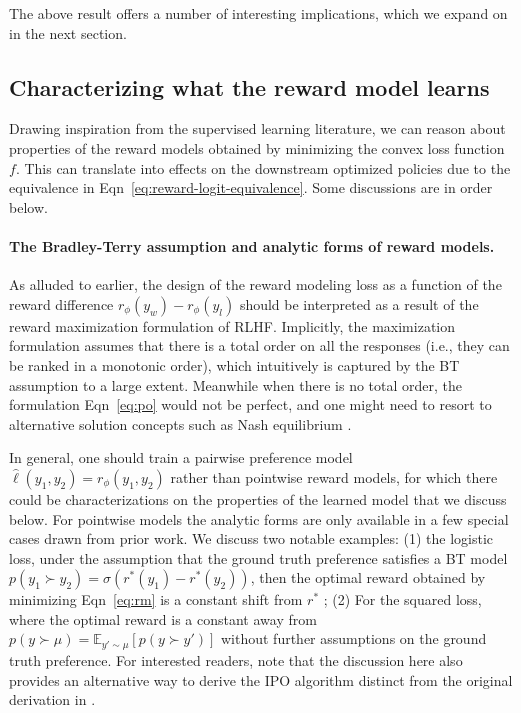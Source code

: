 The above result offers a number of interesting implications, which we expand on in the next section.

\subsection{Characterizing what the reward model learns}

Drawing inspiration from the supervised learning literature, we can reason about properties of the reward models obtained by minimizing the convex loss function $f$. This can translate into effects on the downstream optimized policies due to the equivalence in Eqn~\eqref{eq:reward-logit-equivalence}. Some discussions are in order below.

\paragraph{The Bradley-Terry assumption and analytic forms of reward models.} 

As alluded to earlier, the design of the reward modeling loss as a function of the reward difference $r_\phi(y_w)-r_\phi(y_l)$ should be interpreted as a result of the reward maximization formulation of RLHF. Implicitly, the maximization formulation assumes that there is a total order on all the responses (i.e., they can be ranked in a monotonic order), which intuitively is captured by the BT assumption to a large extent. Meanwhile when there is no total order, the formulation Eqn~\eqref{eq:po} would not be perfect, and one might need to resort to alternative solution concepts such as Nash equilibrium \citep{munos2023nash,swamy2024minimaximalist}. 

In general, one should train a pairwise preference model $\hat{\ell}(y_1,y_2)=r_\phi(y_1,y_2)$ rather than pointwise reward models, for which there could be characterizations on the properties of the learned model that we discuss below. For pointwise models
the analytic forms are only available in a few special cases drawn from prior work. We discuss two notable examples: (1) the logistic loss, under the assumption that the ground truth preference satisfies a BT model $p(y_1\succ y_2)=\sigma\left(r^\ast(y_1)-r^\ast(y_2)\right)$, then the optimal reward obtained by minimizing Eqn~\eqref{eq:rm} is a constant shift from $r^\ast$ \citep{rafailov2023direct}; (2) For the squared loss, where the optimal reward is a constant away from $p(y\succ \mu)=\mathbb{E}_{y'\sim\mu}\left[p(y\succ y')\right]$ without further assumptions on the ground truth preference. For interested readers, note that the discussion here also provides an alternative way to derive the IPO algorithm distinct from the original derivation in \citet{azar2023general}.

